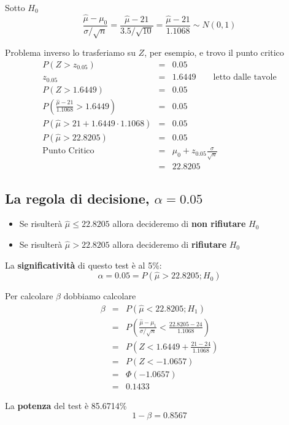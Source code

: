 \documentclass[
  11pt,
]{book}
\providecommand{\tightlist}{%
  \setlength{\itemsep}{0pt}\setlength{\parskip}{0pt}}
\theoremstyle{mytheoremstyle}
\theoremstyle{mydefstyle}
\begin{document}
Sotto \(H_0\)
\[\frac{\hat\mu-\mu_0}{\sigma/\sqrt n}=\frac{\hat\mu-21}{3.5/\sqrt{10}}=\frac{\hat\mu-21}{1.1068}\sim N(0,1)\]

Problema inverso lo trasferiamo su \(Z\), per esempio, e trovo il punto critico
\begin{eqnarray*}
P(Z>z_{0.05}) &=& 0.05 \\
z_{0.05} &=& 1.6449 \qquad \text{letto dalle tavole}\\
P(Z>1.6449) &=& 0.05 \\
P\left(\frac{\hat\mu-21}{1.1068}>1.6449\right)&=&0.05\\
P\left(\hat\mu>21+1.6449\cdot1.1068\right)&=&0.05\\
P\left(\hat\mu>22.8205\right)&=&0.05\\
\text{Punto Critico} &=& \mu_0+z_{0.05}\frac{\sigma}{\sqrt{n}} \\
                     &=& 22.8205
\end{eqnarray*}

\subsection{\texorpdfstring{La regola di decisione, \(\alpha=0.05\)}{La regola di decisione, \textbackslash alpha=0.05}}\label{la-regola-di-decisione-alpha0.05}

\begin{itemize}
\tightlist
\item
  Se risulterà \(\hat\mu\leq 22.8205\) allora decideremo di \textbf{non rifiutare} \(H_0\)
\item
  Se risulterà \(\hat\mu>22.8205\) allora decideremo di \textbf{rifiutare} \(H_0\)
\end{itemize}

La \textbf{significatività} di questo test è al 5\%:
\[\alpha=0.05=P(\hat\mu>22.8205;H_0)\]

Per calcolare \(\beta\) dobbiamo calcolare
\begin{eqnarray*}
  \beta &=& P(\hat\mu<22.8205;H_1) \\
  &=&      P\left(\frac{\hat\mu-\mu_1}{\sigma/\sqrt n}<\frac{22.8205-24}{1.1068}\right)\\
      &=& P\left(Z<1.6449+\frac{21-24}{1.1068}\right)\\
  &=&P(Z<-1.0657)\\
  &=&\Phi(-1.0657)\\
  &=&0.1433
\end{eqnarray*}

La \textbf{potenza} del test è 85.6714\%
\[1-\beta=0.8567\]
\end{document}
